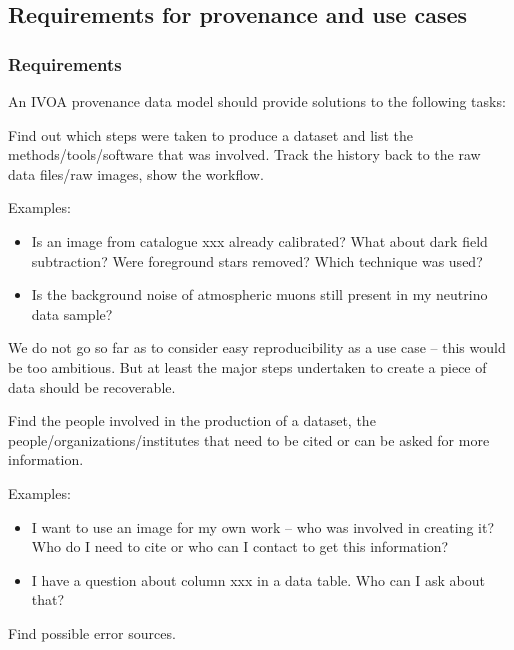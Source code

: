 \subsection{Requirements for provenance and use cases}
\subsubsection{Requirements}\label{sec:requirements}

An IVOA provenance data model should provide solutions to the following tasks:

        Find out which steps were taken to produce a dataset and list the methods/tools/software that was involved. 
        Track the history back to the raw data files/raw images, show the workflow.

        \noindent Examples: 
        \begin{itemize}
            \item Is an image from catalogue xxx already calibrated?
What about dark field subtraction? Were foreground stars removed? Which technique
was used?  
            
            \item Is the background noise of atmospheric muons still present in my neutrino data sample?  
        \end{itemize}

        We do not go so far as to consider easy reproducibility as a use case -- this would be too ambitious. But at least the 
        major steps undertaken to create a piece of data should be recoverable.

      
        Find the people involved in the production of a dataset,
        the people/organizations/institutes that need to be cited or can be asked for more information.

        \noindent Examples: 
        \begin{itemize}
            \item I want to use an image for my own work -- who was involved in
creating it? Who do I need to cite or who can I contact to get this information?  
            \item I have a question about column xxx in a data
table. Who can I ask about that?  
        \end{itemize}
      

        Find possible error sources.

